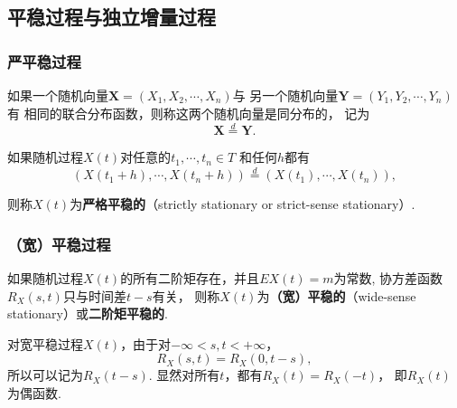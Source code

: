 \subsection{平稳过程与独立增量过程}

\begin{frame}
    \frametitle{严平稳过程}
    \begin{mydefinition}[同分布的随机向量]
        如果一个随机向量$\bm X=(X_1,X_2,\cdots,X_n)$与
        另一个随机向量$\bm Y=(Y_1,Y_2,\cdots,Y_n)$有
        相同的联合分布函数，则称这两个随机向量是同分布的，
        记为
        $$
          \bm X\overset{d}{=}\bm Y.
        $$        
    \end{mydefinition}

    \begin{mydefinition}[严平稳过程]\label{def:strictly-stationary-process}
        如果随机过程$X(t)$对任意的$t_1,\cdots,t_n\in T$
        和任何$h$都有
        \begin{equation}\label{eq:strictly-stationary}
            (X(t_1+h),\cdots,X(t_n+h))\overset{d}{=} (X(t_1),\cdots,X(t_n)),            
        \end{equation}

        则称$X(t)$为\textbf{严格平稳的}（strictly stationary or strict-sense stationary）. 
    \end{mydefinition}

\end{frame}

\begin{frame}
    \frametitle{（宽）平稳过程}
    \begin{mydefinition}[宽平稳过程]\label{def:wide-stationary-process}
        如果随机过程$X(t)$的所有二阶矩存在，并且$EX(t)=m$为常数,
        协方差函数$R_X(s,t)$只与时间差$t-s$有关，
        则称$X(t)$为\textbf{（宽）平稳的}（wide-sense stationary）或\textbf{二阶矩平稳的}. 
    \end{mydefinition}
    对宽平稳过程$X(t)$，由于对$-\infty<s,t<+\infty$，
    $$
        R_X(s,t)=R_X(0,t-s),
    $$
    所以可以记为$R_X(t-s)$. 显然对所有$t$，都有$R_X(t)=R_X(-t)$，
    即$R_X(t)$为偶函数. 

\end{frame}

